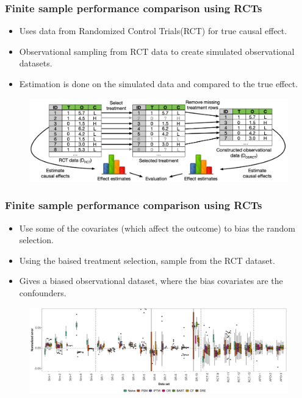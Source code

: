 \documentclass{beamer}
\begin{document}
\begin{frame}
	\frametitle{Finite sample performance comparison using RCTs}
	\begin{itemize}
		\item Uses data from Randomized Control Trials(RCT) for true causal effect.
		\item Observational sampling from RCT data to create simulated
			observational datasets.
		\item Estimation is done on the simulated data and compared to the true effect.
	\end{itemize}

	\begin{figure}
		\includegraphics[width=\textwidth]{fig_osrct.jpg}
	\end{figure}
\end{frame}

\begin{frame}
	\frametitle{Finite sample performance comparison using RCTs}
	\begin{itemize}
		\item Use some of the covariates (which affect the outcome) to bias the random
			selection.
		\item Using the baised treatment selection, sample from the RCT dataset.
		\item Gives a biased observational dataset, where the bias covariates are the 
			confounders.
	\end{itemize}
	\begin{figure}
		\includegraphics[width=\textwidth]{fig_rct.jpg}
	\end{figure}

\end{frame}
\end{document}
